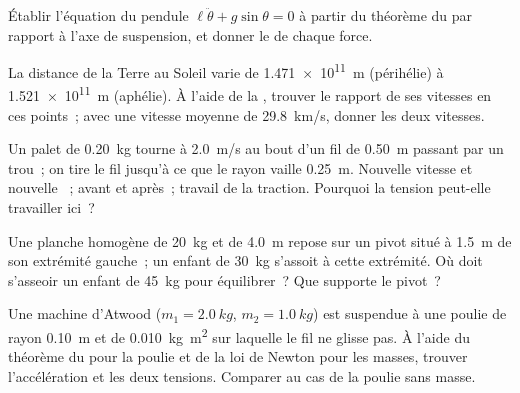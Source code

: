 \begin{exercise}[$\star\star$]\label{exo:b1:angular-momentum:5}
Établir l'équation du pendule $\ell\ddot\theta + g\sin\theta = 0$ à
partir du théorème du  par rapport à l'axe de
suspension, et donner le  de chaque force.
\end{exercise}

\begin{exercise}[$\star\star$]\label{exo:b1:angular-momentum:6}
La distance de la Terre au Soleil varie de \qty{1.471e11}{m} (périhélie)
à \qty{1.521e11}{m} (aphélie). À l'aide de la , trouver le
rapport de ses vitesses en ces points~; avec une vitesse moyenne de
\qty{29.8}{km/s}, donner les deux vitesses.
\end{exercise}

\begin{exercise}[$\star\star$]\label{exo:b1:angular-momentum:7}
Un palet de \qty{0.20}{kg} tourne à \qty{2.0}{m/s} au bout d'un fil de
\qty{0.50}{m} passant par un trou~; on tire le fil jusqu'à ce que le
rayon vaille \qty{0.25}{m}. Nouvelle vitesse et nouvelle ~;  avant et après~; travail de la traction.
Pourquoi la tension peut-elle travailler ici~?
\end{exercise}

\begin{exercise}[$\star\star$]\label{exo:b1:angular-momentum:8}
Une planche homogène de \qty{20}{kg} et de \qty{4.0}{m} repose sur un
pivot situé à \qty{1.5}{m} de son extrémité gauche~; un enfant de
\qty{30}{kg} s'assoit à cette extrémité. Où doit s'asseoir un enfant de
\qty{45}{kg} pour équilibrer~? Que supporte le pivot~?
\end{exercise}

\begin{exercise}[$\star\star$]\label{exo:b1:angular-momentum:9}
Une machine d'Atwood ($m_1 = \qty{2.0}{kg}$, $m_2 = \qty{1.0}{kg}$) est
suspendue à une poulie de rayon \qty{0.10}{m} et de 
\qty{0.010}{kg.m^2} sur laquelle le fil ne glisse pas. À l'aide du
théorème du  pour la poulie et de la loi de Newton pour
les masses, trouver l'accélération et les deux tensions. Comparer au cas
de la poulie sans masse.
\end{exercise}

